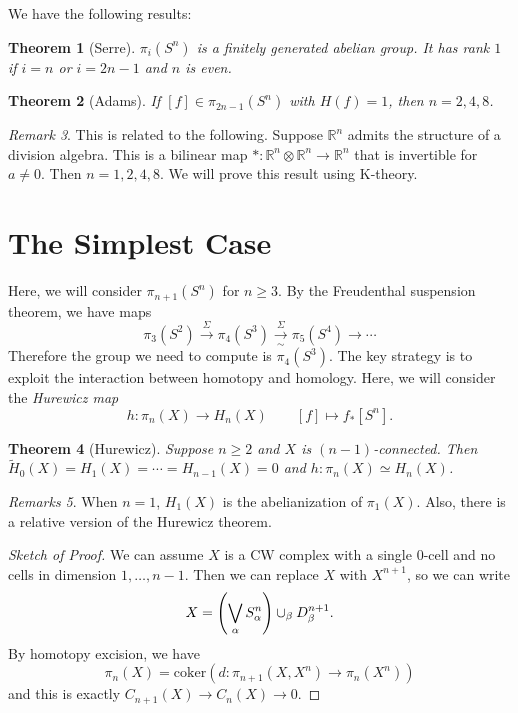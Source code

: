 \documentclass[leqno, openany]{memoir}
\newtheorem{thm}{Theorem}[section]
\theoremstyle{definition}
\theoremstyle{remark}
\newtheorem{rmk}[thm]{Remark}
\newtheorem{rmks}[thm]{Remarks}
\theoremstyle{plain}
\theoremstyle{definition}
\theoremstyle{remark}
\newcommand{\R}{\mathbb{R}}
\newcommand{\mr}[1]{\mathrm{#1}}
\newcommand{\wt}[1]{\widetilde{#1}}
\begin{document}
We have the following results:

\begin{thm}[Serre]
    $\pi_i(S^n)$ is a finitely generated abelian group. It has rank $1$ if $i = n$ or $i = 2n-1$ and $n$ is even.
\end{thm}

\begin{thm}[Adams]
    If $[f] \in \pi_{2n-1}(S^n)$ with $H(f) = 1$, then $n = 2,4,8$.
\end{thm}

\begin{rmk}
    This is related to the following. Suppose $\R^n$ admits the structure of a division algebra. This is a bilinear map $* \colon \R^n \otimes \R^n \to \R^n$ that is invertible for $a \neq 0$. Then $n = 1,2,4,8$. We will prove this result using K-theory.
\end{rmk}

\section{The Simplest Case}%
\label{sec:the_simplest_case}

Here, we will consider $\pi_{n+1}(S^n)$ for $n \geq 3$. By the Freudenthal suspension theorem, we have maps
\[ \pi_3(S^2) \xrightarrow{\Sigma} \pi_4(S^3) \xrightarrow[\sim]{\Sigma} \pi_5(S^4) \to \cdots \]
Therefore the group we need to compute is $\pi_4(S^3)$. The key strategy is to exploit the interaction between homotopy and homology. Here, we will consider the \textit{Hurewicz map}
\[ h \colon \pi_n(X) \to H_n(X) \qquad [f] \mapsto f_* [S^n]. \]

\begin{thm}[Hurewicz]
    Suppose $n \geq 2$ and $X$ is $(n-1)$-connected. Then $\wt{H}_0(X) = H_1(X) = \cdots = H_{n-1}(X) = 0$ and $h \colon \pi_n(X) \simeq H_n(X)$.
\end{thm}

\begin{rmks}
    When $n = 1$, $H_1(X)$ is the abelianization of $\pi_1(X)$. Also, there is a relative version of the Hurewicz theorem.
\end{rmks}

\begin{proof}[Sketch of Proof]
    We can assume $X$ is a CW complex with a single $0$-cell and no cells in dimension $1, \ldots, n-1$. Then we can replace $X$ with $X^{n+1}$, so we can write
    \[ X = \qty( \bigvee_{\alpha} S_{\alpha}^n ) \cup_{\beta} D_{\beta}^{n+1}. \]
    By homotopy excision, we have
    \[ \pi_n(X) = \mr{coker}(d \colon \pi_{n+1}(X, X^n) \to \pi_n(X^n)) \]
    and this is exactly $C_{n+1}(X) \to C_n(X) \to 0$.
\end{proof}
\end{document}
